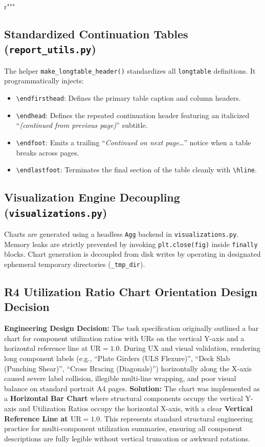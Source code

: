 r"""\documentclass[11pt,a4paper]{article}
\begin{document}
\subsection{Standardized Continuation Tables (\texttt{report\_utils.py})}
The helper \texttt{make\_longtable\_header()} standardizes all \texttt{longtable} definitions. It programmatically injects:
\begin{itemize}
    \item \texttt{\textbackslash endfirsthead}: Defines the primary table caption and column headers.
    \item \texttt{\textbackslash endhead}: Defines the repeated continuation header featuring an italicized ``\textit{(continued from previous page)}'' subtitle.
    \item \texttt{\textbackslash endfoot}: Emits a trailing ``\textit{Continued on next page\ldots}'' notice when a table breaks across pages.
    \item \texttt{\textbackslash endlastfoot}: Terminates the final section of the table cleanly with \texttt{\textbackslash hline}.
\end{itemize}

\subsection{Visualization Engine Decoupling (\texttt{visualizations.py})}
Charts are generated using a headless \texttt{Agg} backend in \texttt{visualizations.py}. Memory leaks are strictly prevented by invoking \texttt{plt.close(fig)} inside \texttt{finally} blocks. Chart generation is decoupled from disk writes by operating in designated ephemeral temporary directories (\texttt{\_tmp\_dir}).

\subsection{R4 Utilization Ratio Chart Orientation Design Decision}
\textbf{Engineering Design Decision:} The task specification originally outlined a bar chart for component utilization ratios with URs on the vertical Y-axis and a horizontal reference line at $\text{UR} = 1.0$. During UX and visual validation, rendering long component labels (e.g., ``Plate Girders (ULS Flexure)'', ``Deck Slab (Punching Shear)'', ``Cross Bracing (Diagonals)'') horizontally along the X-axis caused severe label collision, illegible multi-line wrapping, and poor visual balance on standard portrait A4 pages.
\textbf{Solution:} The chart was implemented as a \textbf{Horizontal Bar Chart} where structural components occupy the vertical Y-axis and Utilization Ratios occupy the horizontal X-axis, with a clear \textbf{Vertical Reference Line at $\text{UR} = 1.0$}. This represents standard structural engineering practice for multi-component utilization summaries, ensuring all component descriptions are fully legible without vertical truncation or awkward rotations.
\end{document}
